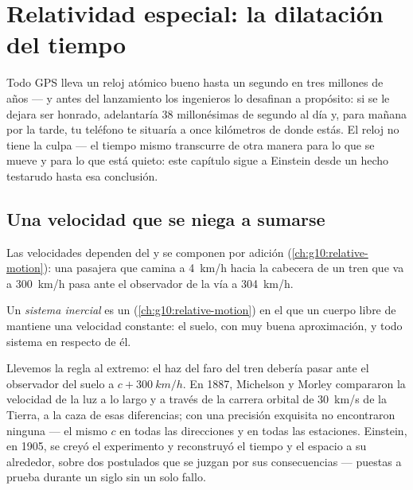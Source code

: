 \chapter{Relatividad especial: la dilatación del tiempo}\label{ch:g12:special-relativity}

Todo  GPS lleva un reloj atómico bueno hasta un segundo en tres millones de
años --- y antes del lanzamiento los ingenieros lo desafinan a propósito: si se le
dejara ser honrado, adelantaría 38 millonésimas de segundo al día y, para mañana por
la tarde, tu teléfono te situaría a once kilómetros de donde estás. El reloj no tiene
la culpa --- el tiempo mismo transcurre de otra manera para lo que se mueve y para lo
que está quieto: este capítulo sigue a Einstein desde un hecho testarudo hasta esa
conclusión.

\section{Una velocidad que se niega a sumarse}

Las velocidades dependen del  y se componen por adición
(\cref{ch:g10:relative-motion}): una pasajera que camina a \qty{4}{km/h} hacia la
cabecera de un tren que va a \qty{300}{km/h} pasa ante el observador de la vía a
\qty{304}{km/h}.

\begin{definition}\label{def:g12:special-relativity:inertial}
Un \emph{sistema inercial} es un 
(\cref{ch:g10:relative-motion}) en el que un cuerpo libre de  mantiene una
velocidad constante: el suelo, con muy buena aproximación, y todo sistema en
 respecto de él.
\end{definition}

Llevemos la regla al extremo: el haz del faro del tren debería pasar ante el
observador del suelo a $c + \qty{300}{km/h}$. En 1887, Michelson y Morley compararon
la velocidad de la luz a lo largo y a través de la carrera orbital de \qty{30}{km/s}
de la Tierra, a la caza de esas diferencias; con una precisión exquisita no
encontraron ninguna --- el mismo $c$ en todas las direcciones y en todas las
estaciones. Einstein, en 1905, se creyó el experimento y reconstruyó el tiempo y el
espacio a su alrededor, sobre dos postulados que se juzgan por sus consecuencias ---
puestas a prueba durante un siglo sin un solo fallo.

